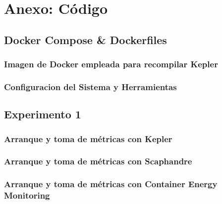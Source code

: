\chapter{Anexo: Código} \label{chapt:apendice}

 \section{Docker Compose \& Dockerfiles}
 \subsection*{Imagen de Docker empleada para recompilar Kepler}
     
     
 \subsection*{Configuracion del Sistema y Herramientas}
     

\section{Experimento 1}
     

  \subsection*{Arranque y toma de métricas con Kepler}
     
  \subsection*{Arranque y toma de métricas con Scaphandre}
    
 \subsection*{Arranque y toma de métricas con Container Energy Monitoring}
    
    
